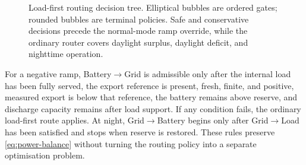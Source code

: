 \begin{figure}[H]
\caption{Load-first routing decision tree. Elliptical bubbles are ordered gates; rounded bubbles are terminal policies. Safe and conservative decisions precede the normal-mode ramp override, while the ordinary router covers daylight surplus, daylight deficit, and nighttime operation.}
\label{fig:routing-policy}
\end{figure}



For a negative ramp, Battery$\to$Grid is admissible only after the internal load has been fully served, the export reference is present, fresh, finite, and positive, measured export is below that reference, the battery remains above reserve, and discharge capacity remains after load support. If any condition fails, the ordinary load-first route applies. At night, Grid$\to$Battery begins only after Grid$\to$Load has been satisfied and stops when reserve is restored. These rules preserve \autoref{eq:power-balance} without turning the routing policy into a separate optimisation problem.